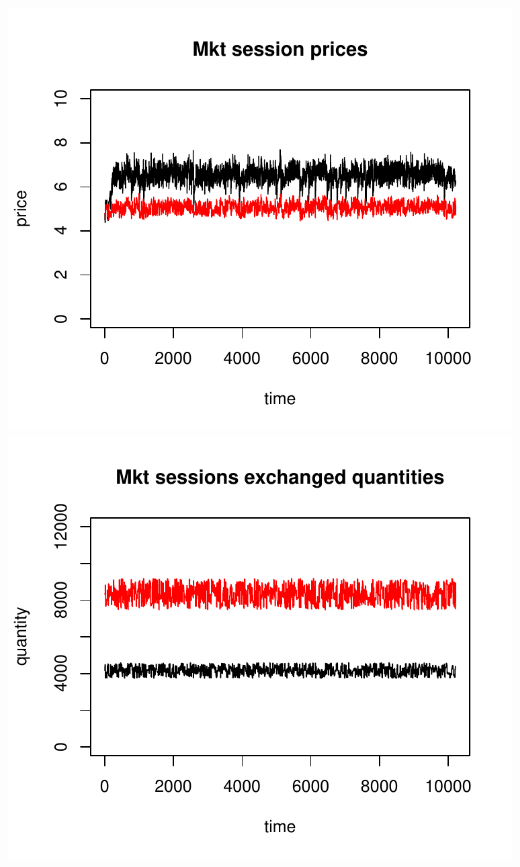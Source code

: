 \documentclass{article}
\begin{document}
\noindent
\vskip-5mm
\hskip-1cm
\includegraphics[scale=0.5]{fig_case03_prices}
\includegraphics[scale=0.5]{fig_case03_quantities}
\end{document}
